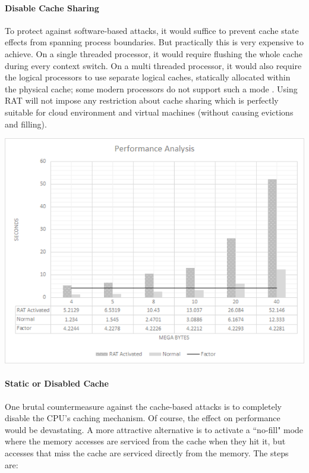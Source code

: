 \paragraph{Disable Cache Sharing}
To protect against software-based attacks, it would suffice to prevent cache state effects from spanning process boundaries. But practically this is very expensive to achieve. On a single threaded processor, it would require flushing the whole cache during every context switch. On a multi threaded processor, it would also require the logical processors to use separate logical caches, statically allocated within the physical cache; some modern processors do not support such a mode \citep{osvik}. Using RAT will not impose any restriction about cache sharing which is perfectly suitable for cloud environment and virtual machines (without causing evictions and filling).

\begin{center}
\includegraphics[scale=0.6,natwidth=640,natheight=480]{psd/performance_analysis.png}
\end{center}

\paragraph{Static or Disabled Cache}
One brutal countermeasure against the cache-based attacks is to completely disable the CPU's caching mechanism. Of course, the effect on performance would be devastating. A more attractive alternative is to activate a ``no-fill" mode where the memory accesses are serviced from the cache when they hit it, but accesses that miss the cache are serviced directly from the memory. The steps are:

